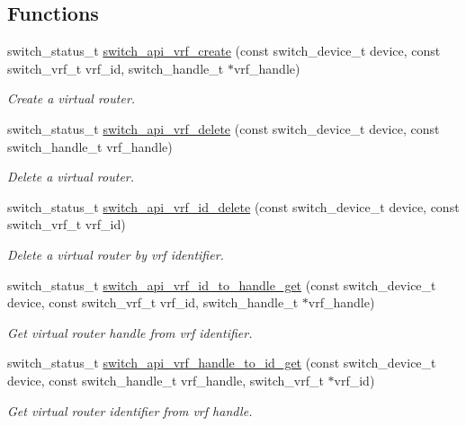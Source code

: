 \subsection*{Functions}
\begin{DoxyCompactItemize}
\item 
switch\+\_\+status\+\_\+t \hyperlink{group__VRF_ga3d660a81d57eb853cea3087242cd4369}{switch\+\_\+api\+\_\+vrf\+\_\+create} (const switch\+\_\+device\+\_\+t device, const switch\+\_\+vrf\+\_\+t vrf\+\_\+id, switch\+\_\+handle\+\_\+t $\ast$vrf\+\_\+handle)
\begin{DoxyCompactList}\small\item\em Create a virtual router. \end{DoxyCompactList}\item 
switch\+\_\+status\+\_\+t \hyperlink{group__VRF_gad3c6e261a5c6b46706a16e8b7551efeb}{switch\+\_\+api\+\_\+vrf\+\_\+delete} (const switch\+\_\+device\+\_\+t device, const switch\+\_\+handle\+\_\+t vrf\+\_\+handle)
\begin{DoxyCompactList}\small\item\em Delete a virtual router. \end{DoxyCompactList}\item 
switch\+\_\+status\+\_\+t \hyperlink{group__VRF_ga9e7b4703f6c1b9e78e1736c670b33084}{switch\+\_\+api\+\_\+vrf\+\_\+id\+\_\+delete} (const switch\+\_\+device\+\_\+t device, const switch\+\_\+vrf\+\_\+t vrf\+\_\+id)
\begin{DoxyCompactList}\small\item\em Delete a virtual router by vrf identifier. \end{DoxyCompactList}\item 
switch\+\_\+status\+\_\+t \hyperlink{group__VRF_ga78fbe0d7a736edcd2343ca639a3db970}{switch\+\_\+api\+\_\+vrf\+\_\+id\+\_\+to\+\_\+handle\+\_\+get} (const switch\+\_\+device\+\_\+t device, const switch\+\_\+vrf\+\_\+t vrf\+\_\+id, switch\+\_\+handle\+\_\+t $\ast$vrf\+\_\+handle)
\begin{DoxyCompactList}\small\item\em Get virtual router handle from vrf identifier. \end{DoxyCompactList}\item 
switch\+\_\+status\+\_\+t \hyperlink{group__VRF_ga088fd3673da11c5666e0be69c4b4f5c9}{switch\+\_\+api\+\_\+vrf\+\_\+handle\+\_\+to\+\_\+id\+\_\+get} (const switch\+\_\+device\+\_\+t device, const switch\+\_\+handle\+\_\+t vrf\+\_\+handle, switch\+\_\+vrf\+\_\+t $\ast$vrf\+\_\+id)
\begin{DoxyCompactList}\small\item\em Get virtual router identifier from vrf handle. \end{DoxyCompactList}\item 

\end{DoxyCompactItemize}
